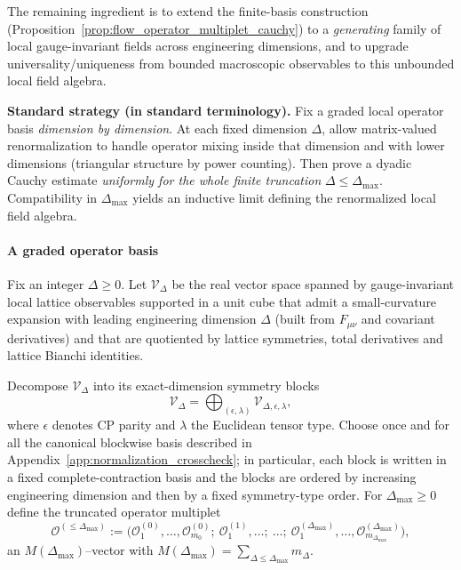 The remaining ingredient is to extend the finite-basis construction
(Proposition~\ref{prop:flow_operator_multiplet_cauchy}) to a \emph{generating} family of local gauge-invariant fields across
engineering dimensions, and to upgrade universality/uniqueness from bounded macroscopic observables to this unbounded local field algebra.

\medskip
\noindent
\textbf{Standard strategy (in standard terminology).}
Fix a graded local operator basis \emph{dimension by dimension}. At each fixed dimension $\Delta$, allow matrix-valued renormalization to
handle operator mixing inside that dimension and with lower dimensions (triangular structure by power counting).
Then prove a dyadic Cauchy estimate \emph{uniformly for the whole finite truncation} $\Delta\le \Delta_{\max}$.
Compatibility in $\Delta_{\max}$ yields an inductive limit defining the renormalized local field algebra.

\paragraph*{A graded operator basis}

\begin{definition}
\label{def:local_operator_spaces}
Fix an integer $\Delta\ge 0$.
Let $\mathscr V_{\Delta}$ be the real vector space spanned by gauge-invariant local lattice observables supported in a unit cube
that admit a small-curvature expansion with leading engineering dimension $\Delta$ (built from $F_{\mu\nu}$ and covariant derivatives)
and that are quotiented by lattice symmetries, total derivatives and lattice Bianchi identities.

Decompose $\mathscr V_{\Delta}$ into its exact-dimension symmetry blocks
\[
\mathscr V_{\Delta}=\bigoplus_{(\epsilon,\lambda)} \mathscr V_{\Delta,\epsilon,\lambda},
\]
where $\epsilon$ denotes CP parity and $\lambda$ the Euclidean tensor type.
Choose once and for all the canonical blockwise basis described in Appendix~\ref{app:normalization_crosscheck}; in particular, each block is written in a fixed complete-contraction basis and the blocks are ordered by increasing engineering dimension and then by a fixed symmetry-type order.
For $\Delta_{\max}\ge 0$ define the truncated operator multiplet
\[
\mathbf{\mathcal O}^{(\le \Delta_{\max})}
:=\bigl(\mathcal O^{(0)}_1,\dots,\mathcal O^{(0)}_{m_0};\ \mathcal O^{(1)}_1,\dots;\ \dots;\ \mathcal O^{(\Delta_{\max})}_1,\dots,\mathcal O^{(\Delta_{\max})}_{m_{\Delta_{\max}}}\bigr),
\]
an $M(\Delta_{\max})$--vector with $M(\Delta_{\max})=\sum_{\Delta\le \Delta_{\max}} m_{\Delta}$.
\end{definition}

